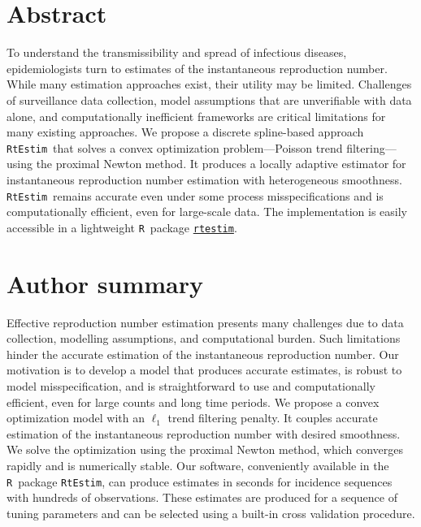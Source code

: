\documentclass[10pt,letterpaper]{article}
\newcommand{\R}{\texttt{R}}
\def\RtEstim{\texttt{RtEstim}}
\begin{document}
\section*{Abstract}

To understand the transmissibility and spread of infectious diseases,
epidemiologists turn to estimates of the instantaneous reproduction number.
While many estimation approaches exist, their utility may be limited. 
Challenges of surveillance data collection, model assumptions
that are unverifiable with data alone, and 
computationally inefficient frameworks are critical limitations for many
existing approaches. We propose a discrete spline-based approach 
\RtEstim\ that solves a convex optimization problem---Poisson trend filtering---using the proximal Newton method. It produces a locally adaptive 
estimator for instantaneous reproduction number estimation with heterogeneous 
smoothness. \RtEstim\ remains accurate even under some process 
misspecifications and is computationally efficient, even for large-scale 
data. The implementation is easily accessible in a lightweight \R\ 
package \href{https://dajmcdon.github.io/rtestim/index.html}{\texttt{rtestim}}.


\section*{Author summary}

Effective reproduction number estimation presents many challenges due to data
collection, modelling assumptions, and computational burden. Such limitations
hinder the accurate estimation of the instantaneous reproduction number. Our
motivation is to develop a model that produces accurate estimates, is robust to
model misspecification, and is straightforward to use and computationally
efficient, even for large counts and long time periods. We propose a convex
optimization model with an $\ell_1$ trend filtering penalty. It couples accurate
estimation of the instantaneous reproduction number with desired smoothness. We
solve the optimization using the proximal Newton method, which converges rapidly
and is numerically stable. Our software, conveniently available in the \R\
package \RtEstim, can produce estimates in seconds for incidence sequences with
hundreds of observations. These estimates are produced for a sequence of tuning
parameters and can be selected using a built-in cross validation procedure. 
\end{document}
